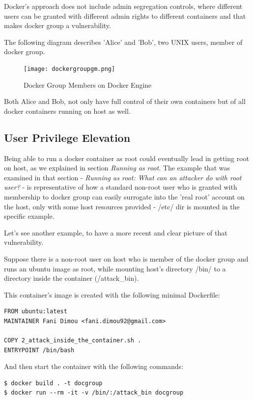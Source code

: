 Docker's approach does not include admin segregation controls, where different users can be granted with different admin rights to different containers and that makes docker group a vulnerability.

The following diagram describes 'Alice' and 'Bob', two UNIX users, member of docker group.

\begin{figure}[h!]
  \centering
   \texttt{[image: dockergroupgm.png]}
   \caption{Docker Group Members on Docker Engine}
\end{figure}

Both Alice and Bob, not only have full control of their own containers but of all docker containers running on host as well.

\subsection{User Privilege Elevation}
Being able to run a docker container as root could eventually lead in getting root on host, as we explained in section \textit{Running as root}. The example that was examined in that section - \textit{Running as root: What can an attacker do with root user?} - is representative of how a standard non-root user who is granted with membership to docker group can easily surrogate into the 'real root' account on the host, only with some host resources provided - /etc/ dir is mounted in the specific example.

Let's see another example, to have a more recent and clear picture of that vulnerability.

Suppose there is a non-root user on host who is member of the docker group and runs an ubuntu image as root, while mounting host's directory /bin/ to a directory inside the container (/attack\_bin). 

This container's image is created with the following minimal Dockerfile:

\begin{lstlisting}[style=Dockerfile, caption={Dockerfile used for docgroup image}]
FROM ubuntu:latest
MAINTAINER Fani Dimou <fani.dimou92@gmail.com>

COPY 2_attack_inside_the_container.sh .
ENTRYPOINT /bin/bash
\end{lstlisting}

And then start the container with the following commands:
\begin{lstlisting}[style=dockercommands]
$ docker build . -t docgroup
$ docker run --rm -it -v /bin/:/attack_bin docgroup
\end{lstlisting}

